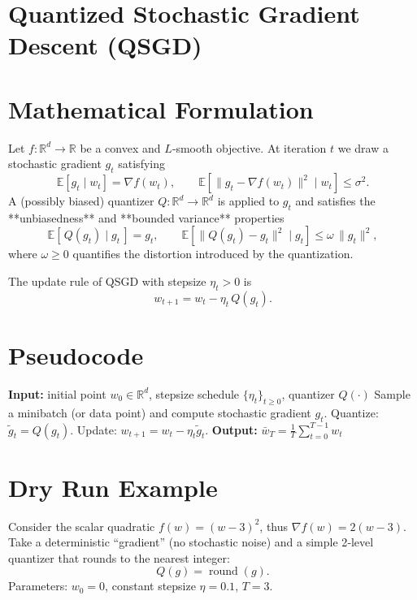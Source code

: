 \documentclass{article}
\newcommand{\E}{\mathbb{E}}
\newcommand{\R}{\mathbb{R}}
\begin{document}
\section*{Quantized Stochastic Gradient Descent (QSGD)}

\section*{Mathematical Formulation}
Let $f:\R^{d}\rightarrow\R$ be a convex and $L$‑smooth objective.  
At iteration $t$ we draw a stochastic gradient $g_{t}$ satisfying
\[
\E[g_{t}\mid w_{t}] = \nabla f(w_{t}), \qquad 
\E\!\left[\|g_{t}-\nabla f(w_{t})\|^{2}\mid w_{t}\right]\le\sigma^{2}.
\]
A (possibly biased) quantizer $Q:\R^{d}\rightarrow\R^{d}$ is applied to $g_{t}$ and satisfies the **unbiasedness** and **bounded variance** properties
\[
\E[\,Q(g_{t})\mid g_{t}\,]=g_{t},\qquad 
\E\!\left[\|Q(g_{t})-g_{t}\|^{2}\mid g_{t}\right]\le \omega\,\|g_{t}\|^{2},
\tag{1}
\]
where $\omega\ge0$ quantifies the distortion introduced by the quantization.

The update rule of QSGD with stepsize $\eta_{t}>0$ is
\[
w_{t+1}=w_{t}-\eta_{t}\,Q(g_{t}). \tag{2}
\]

\section*{Pseudocode}
\begin{algorithm}[H]
\caption{Quantized Stochastic Gradient Descent (QSGD)}
\begin{algorithmic}[1]
\State \textbf{Input:} initial point $w_{0}\in\R^{d}$, stepsize schedule $\{\eta_{t}\}_{t\ge0}$, quantizer $Q(\cdot)$
    \State Sample a minibatch (or data point) and compute stochastic gradient $g_{t}$.
    \State Quantize: $\tilde g_{t}=Q(g_{t})$.
    \State Update: $w_{t+1}=w_{t}-\eta_{t}\tilde g_{t}$.
\EndFor
\State \textbf{Output:} $\bar w_{T}= \frac{1}{T}\sum_{t=0}^{T-1} w_{t}$
\end{algorithmic}
\end{algorithm}

\section*{Dry Run Example}
Consider the scalar quadratic $f(w)=(w-3)^{2}$, thus $\nabla f(w)=2(w-3)$.  
Take a deterministic ``gradient'' (no stochastic noise) and a simple 2‑level quantizer that rounds to the nearest integer:
\[
Q(g)=\operatorname{round}(g).
\]
Parameters: $w_{0}=0$, constant stepsize $\eta=0.1$, $T=3$.
\end{document}
